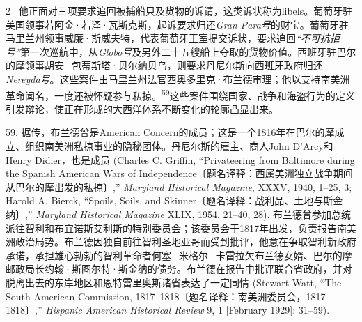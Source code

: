 \documentclass[10pt,a4paper]{article}
\begin{document}
\begin{paracol}{2}
\switchcolumn*
{\scriptsize\color{gray} [p. 14]}\ 他正面对三项要求追回被捕船只及货物的诉请，这类诉状称为libels。葡萄牙驻美国领事若阿金·若泽·瓦斯克斯，起诉要求归还\textit{Gran Para号}的财宝。葡萄牙驻马里兰州领事威廉·斯威夫特，代表葡萄牙王室提交诉状，要求追回\textit{“不可抗拒号”}第一次巡航中，从\textit{Globo号}及另外二十五艘船上夺取的货物价值。西班牙驻巴尔的摩领事胡安·包蒂斯塔·贝尔纳贝乌，则要求丹尼尔斯向西班牙政府归还\textit{Nereyda号}。这些案件由马里兰州法官西奥多里克·布兰德审理；他以支持南美洲革命闻名，一度还被怀疑参与私\mbox{掠。\textsuperscript{59}}这些案件围绕国家、战争和海盗行为的定义引发辩论，使正在形成的大西洋体系不断变化的轮廓凸显出来。\par{\small 59. 据传，布兰德曾是American Concern的成员；这是一个1816年在巴尔的摩成立、组织南美洲私掠事业的隐秘团体。丹尼尔斯的雇主、商人John D’Arcy和Henry Didier，也是成员 (Charles C. Griffin, “Privateering from Baltimore during the Spanish American Wars of Independence〔题名译释：西属美洲独立战争期间从巴尔的摩出发的私掠〕,” \textit{Maryland Historical Magazine}, XXXV, 1940, 1–25, 3; Harold A. Bierck, “Spoils, Soils, and Skinner〔题名译释：战利品、土地与斯金纳〕,” \textit{Maryland Historical Magazine} XLIX, 1954, 21–40, 28). 布兰德曾参加总统派往智利和布宜诺斯艾利斯的特别委员会；该委员会于1817年出发，负责报告南美洲政治局势。布兰德因独自前往智利圣地亚哥而受到批评，他意在争取智利新政府承诺，承担雄心勃勃的智利革命者何塞·米格尔·卡雷拉欠布兰德女婿、巴尔的摩邮政局长约翰·斯图尔特·斯金纳的债务。布兰德在报告中批评联合省政府，并对脱离出去的东岸地区和恩特雷里奥斯诸省表达了一定同情 (Stewart Watt, “The South American Commission, 1817–1818〔题名译释：南美洲委员会，1817—1818〕,” \textit{Hispanic American Historical Review} 9, 1 [February 1929]: 31–59).\par}
\switchcolumn

\end{paracol}
\end{document}
